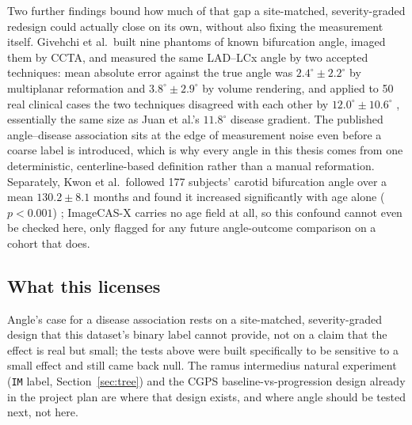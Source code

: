 Two further findings bound how much of that gap a site-matched, severity-graded redesign could
actually close on its own, without also fixing the measurement itself. Givehchi et al.\ built nine
phantoms of known bifurcation angle, imaged them by CCTA, and measured the same LAD--LCx angle by
two accepted techniques: mean absolute error against the true angle was $2.4^\circ \pm 2.2^\circ$ by
multiplanar reformation and $3.8^\circ \pm 2.9^\circ$ by volume rendering, and applied to 50 real
clinical cases the two techniques disagreed with each other by $12.0^\circ \pm 10.6^\circ$
\cite{givehchi2018phantom}, essentially the same size as Juan et al.'s $11.8^\circ$ disease
gradient. The published angle--disease association sits at the edge of measurement noise even
before a coarse label is introduced, which is why every angle in this thesis comes from one
deterministic, centerline-based definition rather than a manual reformation. Separately, Kwon et
al.\ followed 177 subjects' carotid bifurcation angle over a mean $130.2 \pm 8.1$ months and found
it increased significantly with age alone ($p<0.001$) \cite{kwon2022carotid}; ImageCAS-X carries no
age field at all, so this confound cannot even be checked here, only flagged for any future
angle-outcome comparison on a cohort that does.

\subsection*{What this licenses}

Angle's case for a disease association rests on a site-matched, severity-graded design that this
dataset's binary label cannot provide, not on a claim that the effect is real but small; the tests
above were built specifically to be sensitive to a small effect and still came back null. The ramus
intermedius natural experiment (\texttt{IM} label, Section~\ref{sec:tree}) and the CGPS
baseline-vs-progression design already in the project plan are where that design exists, and where
angle should be tested next, not here.

